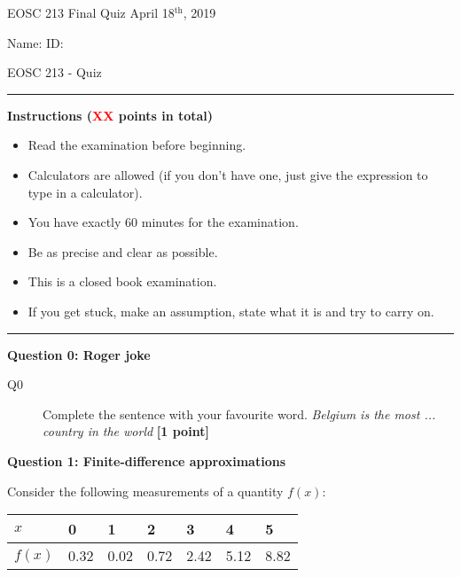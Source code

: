 \documentclass{article}
\begin{document}
\pagestyle{first}


\large{EOSC 213 Final Quiz} \hspace{10cm} \large{April 18$^{\textrm{th}}$, 2019}

\large{Name:} \hspace{12cm} \large{ID: }
\begin{center}
\Huge{EOSC 213 - Quiz}
\end{center}

\rule{\textwidth}{1pt}

\large{\textbf{Instructions (\textcolor{red}{XX} points in total)}}
\begin{multicols}{2}
\begin{itemize}
\item Read the examination before beginning.
\item Calculators are allowed (if you don't have one, just give the expression to type in a calculator).
\item You have exactly 60 minutes for the examination.
\item Be as precise and clear as possible.
\item This is a closed book examination.
\item If you get stuck, make an assumption, state what it is and try to carry on.
\end{itemize} 
\end{multicols}



\rule{\textwidth}{1pt}

\textbf{Question 0: Roger joke}

\begin{description}
\item [Q0] Complete the sentence with your favourite word. \textit{Belgium is the most ... country in the world}  \textbf{[1 point]}
\vspace{0.5cm}

\end{description}

\textbf{Question 1: Finite-difference approximations}

Consider the following measurements of a quantity $f(x)$:
\begin{center}
\begin{tabular}{|l|llllll|}
\hline
$x$ & 0 & 1 & 2 & 3 & 4 & 5 \\ \hline
$f(x)$ & 0.32 &   0.02   & 0.72  &  2.42  &  5.12  &  8.82  \\ 
\hline
\end{tabular}
\end{center}
\end{document}
